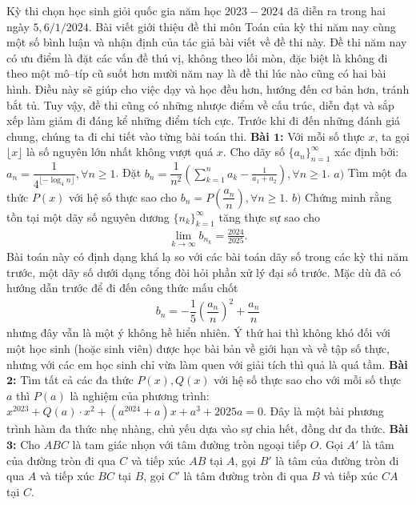 \begin{multicols}{2}
	Kỳ thi chọn học sinh giỏi quốc gia năm học $2023-2024$ đã diễn ra trong hai ngày $5, 6/1/2024$. Bài viết giới thiệu đề thi môn Toán của kỳ thi năm nay cùng một số bình luận và nhận định của tác giả bài viết về đề thi này.
	\vskip 0.1cm
	Đề thi năm nay có ưu điểm là đặt các vấn đề thú vị, không theo lối mòn, đặc biệt là không đi theo một mô--típ cũ suốt hơn mười năm nay là đề thi lúc nào cũng có hai bài hình. Điều này sẽ giúp cho việc dạy và học đều hơn, hướng đến cơ bản hơn, tránh bắt tủ. Tuy vậy, đề thi cũng có những nhược điểm về cấu trúc, diễn đạt và sắp xếp làm giảm đi đáng kể những điểm tích cực. Trước khi đi đến những đánh giá chung, chúng ta đi chi tiết vào từng bài toán thi.
	\vskip 0.1cm
	\textbf{\color{cackithi}Bài $\pmb1$:} Với mỗi số thực $x$, ta gọi $\lfloor x\rfloor$ là số nguyên lớn nhất không vượt quá $x$.
	\vskip 0.1cm
	Cho dãy số $\{a_n\}_{n=1}^\infty$ xác định bởi: $a_n = \dfrac{1}{4^{\lfloor-\log_4 n\rfloor}}, \forall n \ge 1$. Đặt $b_n =  \dfrac{1}{n^2}\left( {\sum\limits_{k = 1}^n {{a_k}}  - \frac{1}{{{a_1} + {a_2}}}} \right), \forall n \ge 1$. 
	\vskip 0.1cm
	$a)$ Tìm một đa thức $P(x)$ với hệ số thực sao cho $b_n = P\left(\dfrac{a_n}{n}\right), \forall n \ge 1$.
	\vskip 0.1cm
	\columnbreak
	$b)$ Chứng minh rằng tồn tại một dãy số nguyên dương $\{n_k\}_{k=1}^\infty$ tăng thực sự sao cho
	\begin{align*}
		\mathop {\lim }\limits_{k \to \infty } {b_{{n_k}}} = \frac{{2024}}{{2025}}. 
	\end{align*}
	Bài toán này có định dạng khá lạ so với các bài toán dãy số trong các kỳ thi năm trước, một dãy số dưới dạng tổng đòi hỏi phần xử lý đại số trước. Mặc dù đã có hướng dẫn trước để đi đến công thức mấu chốt
	\begin{align*}
		b_n = - \dfrac{1}{5}\left(\dfrac{a_n}{n}\right)^2 + \dfrac{a_n}{n}
	\end{align*}
	nhưng đây vẫn là một ý không hề hiển nhiên. Ý thứ hai thì không khó đối với một học sinh (hoặc sinh viên) được học bài bản về giới hạn và về tập số thực, nhưng với các em học sinh chỉ vừa làm quen với giải tích thì quả là quá tầm. 
	\vskip 0.1cm
	\textbf{\color{cackithi}Bài $\pmb2$:} Tìm tất cả các đa thức $P(x), Q(x)$ với hệ số thực sao cho với mỗi số thực $a$ thì $P(a)$ là nghiệm của phương trình: $x^{2023} + Q(a)\cdot x^2 + (a^{2024} + a)x + a^3 + 2025a = 0$.
	\vskip 0.1cm
	Đây là một bài phương trình hàm đa thức nhẹ nhàng, chủ yếu dựa vào sự chia hết, đồng dư đa thức.
	\vskip 0.1cm
	\textbf{\color{cackithi}Bài $\pmb3$:} Cho $ABC$ là tam giác nhọn với tâm đường tròn ngoại tiếp $O$. Gọi $A'$ là tâm của đường tròn đi qua $C$ và tiếp xúc $AB$ tại $A$, gọi $B'$ là tâm của đường tròn đi qua $A$ và tiếp xúc $BC$ tại $B$, gọi $C'$ là tâm đường tròn đi qua $B$ và tiếp xúc $CA$ tại $C$.

\end{multicols}
